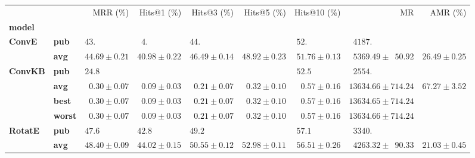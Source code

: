 \begin{tabular}{llrrrrrrr}
\toprule
       &     &                    MRR (\%) &                           Hits@1 (\%) &                 Hits@3 (\%) &                 Hits@5 (\%) &                Hits@10 (\%) &                                         MR &          AMR (\%) \\
\textbf{model} & {} &                             &                                       &                             &                             &                             &                                            &                   \\
\midrule
\textbf{ConvE} & \textbf{pub} &  $43.\phantom{00 \pm 0.00}$ &  $\phantom{0}4.\phantom{00 \pm 0.00}$ &  $44.\phantom{00 \pm 0.00}$ &                             &  $52.\phantom{00 \pm 0.00}$ &  $\phantom{0}4187.\phantom{00 \pm 000.00}$ &                   \\
       & \textbf{avg} &            $44.69 \pm 0.21$ &                      $40.98 \pm 0.22$ &            $46.49 \pm 0.14$ &            $48.92 \pm 0.23$ &            $51.76 \pm 0.13$ &  $\phantom{0}5369.49 \pm \phantom{0}50.92$ &  $26.49 \pm 0.25$ \\\midrule
\textbf{ConvKB} & \textbf{pub} &  $24.8\phantom{0 \pm 0.00}$ &                                       &                             &                             &  $52.5\phantom{0 \pm 0.00}$ &  $\phantom{0}2554.\phantom{00 \pm 000.00}$ &                   \\
       & \textbf{avg} &  $\phantom{0}0.30 \pm 0.07$ &            $\phantom{0}0.09 \pm 0.03$ &  $\phantom{0}0.21 \pm 0.07$ &  $\phantom{0}0.32 \pm 0.10$ &  $\phantom{0}0.57 \pm 0.16$ &                      $13634.66 \pm 714.24$ &  $67.27 \pm 3.52$ \\
       & \textbf{best} &  $\phantom{0}0.30 \pm 0.07$ &            $\phantom{0}0.09 \pm 0.03$ &  $\phantom{0}0.21 \pm 0.07$ &  $\phantom{0}0.32 \pm 0.10$ &  $\phantom{0}0.57 \pm 0.16$ &                      $13634.65 \pm 714.24$ &                   \\
       & \textbf{worst} &  $\phantom{0}0.30 \pm 0.07$ &            $\phantom{0}0.09 \pm 0.03$ &  $\phantom{0}0.21 \pm 0.07$ &  $\phantom{0}0.32 \pm 0.10$ &  $\phantom{0}0.57 \pm 0.16$ &                      $13634.66 \pm 714.24$ &                   \\\midrule
\textbf{RotatE} & \textbf{pub} &  $47.6\phantom{0 \pm 0.00}$ &            $42.8\phantom{0 \pm 0.00}$ &  $49.2\phantom{0 \pm 0.00}$ &                             &  $57.1\phantom{0 \pm 0.00}$ &  $\phantom{0}3340.\phantom{00 \pm 000.00}$ &                   \\
       & \textbf{avg} &            $48.40 \pm 0.09$ &                      $44.02 \pm 0.15$ &            $50.55 \pm 0.12$ &            $52.98 \pm 0.11$ &            $56.51 \pm 0.26$ &  $\phantom{0}4263.32 \pm \phantom{0}90.33$ &  $21.03 \pm 0.45$ \\
\bottomrule
\end{tabular}

